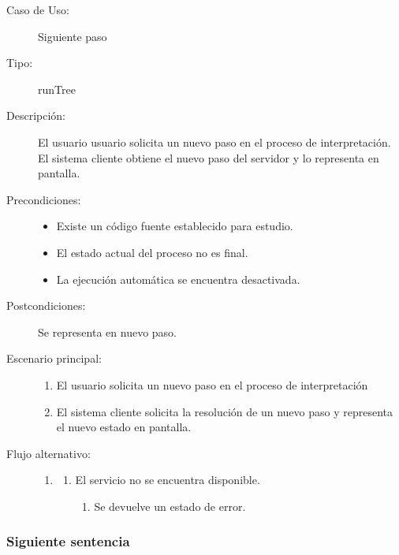 \begin{description}
   \item[Caso de Uso:] Siguiente paso
   \item [Tipo:] runTree
   \item[Descripción:] 
   El usuario usuario solicita un nuevo paso en el proceso de interpretación. 
   El sistema cliente obtiene el nuevo paso del servidor y lo representa en pantalla.
   \item[Precondiciones:] \hfill 
   \begin{itemize}
   \item Existe un código fuente establecido para estudio. 
   \item El estado actual del proceso no es final.
   \item La ejecución automática se encuentra desactivada. 
   \end{itemize}
   \item[Postcondiciones:] 
   Se representa en nuevo paso. 
   \item[Escenario principal:] \hfill
   \begin{enumerate}
   \item El usuario solicita un nuevo paso en el proceso de interpretación
   \item El sistema cliente solicita la resolución de un nuevo paso y representa
   el nuevo estado en pantalla. 
   \end{enumerate}
   \item[Flujo alternativo:] \hfill 
   \begin{enumerate} \itemsep1pt \parskip0pt 
   \setcounter{enumi}{1}
   \renewcommand{\labelenumi}{}
   \renewcommand{\labelenumiii}{\arabic{enumiii}.}
   \renewcommand{\labelenumii}{\arabic{enumi}\alph{enumii}.}
      \item 
      \begin {enumerate}
         \setcounter{enumii}{0}
         \item El servicio no se encuentra disponible.
         \begin{enumerate}
         \item Se devuelve un estado de error.
         \end{enumerate}
      \end{enumerate}
   \end{enumerate}
\end{description}


\subsubsection{Siguiente sentencia} 

